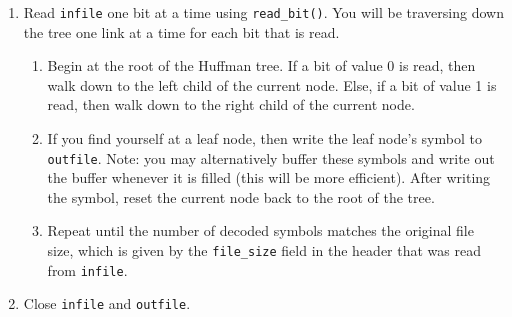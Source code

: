 \begin{enumerate}
  \item Read \texttt{infile} one bit at a time using
    \texttt{read\_bit()}. You will be traversing down the tree one link
    at a time for each bit that is read.

    \begin{enumerate}
      \item Begin at the root of the Huffman tree. If a bit of value 0
        is read, then walk down to the left child of the current node.
        Else, if a bit of value 1 is read, then walk down to the right
        child of the current node.

      \item If you find yourself at a leaf node, then write the leaf
        node's symbol to \texttt{outfile}. Note: you may alternatively
        buffer these symbols and write out the buffer whenever it is
        filled (this will be more efficient). After writing the symbol,
        reset the current node back to the root of the tree.

      \item Repeat until the number of decoded symbols matches the
        original file size, which is given by the \texttt{file\_size}
        field in the header that was read from \texttt{infile}.
    \end{enumerate}

  \item Close \texttt{infile} and \texttt{outfile}.
\end{enumerate}

